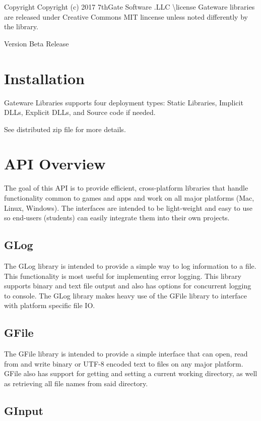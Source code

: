 \begin{DoxyCopyright}{Copyright}
Copyright (c) 2017 7th\+Gate Software .L\+LC \textbackslash{}license Gateware libraries are released under Creative Commons M\+IT lincense unless noted differently by the library. 
\end{DoxyCopyright}
\begin{DoxyVersion}{Version}
Beta Release
\end{DoxyVersion}
\hypertarget{index_Install}{}\section{Installation}\label{index_Install}
Gateware Libraries supports four deployment types\+: Static Libraries, Implicit D\+L\+Ls, Explicit D\+L\+Ls, and Source code if needed.

See distributed zip file for more details.\hypertarget{index_API}{}\section{A\+P\+I Overview}\label{index_API}
The goal of this A\+PI is to provide efficient, cross-\/platform libraries that handle functionality common to games and apps and work on all major platforms (Mac, Linux, Windows). The interfaces are intended to be light-\/weight and easy to use so end-\/users (students) can easily integrate them into their own projects.\hypertarget{index_APIGLog}{}\subsection{G\+Log}\label{index_APIGLog}
The G\+Log library is intended to provide a simple way to log information to a file. This functionality is most useful for implementing error logging. This library supports binary and text file output and also has options for concurrent logging to console. The G\+Log library makes heavy use of the G\+File library to interface with platform specific file IO.\hypertarget{index_APIGFile}{}\subsection{G\+File}\label{index_APIGFile}
The G\+File library is intended to provide a simple interface that can open, read from and write binary or U\+T\+F-\/8 encoded text to files on any major platform. G\+File also has support for getting and setting a current working directory, as well as retrieving all file names from said directory.\hypertarget{index_APIGInput}{}\subsection{G\+Input}\label{index_APIGInput}
